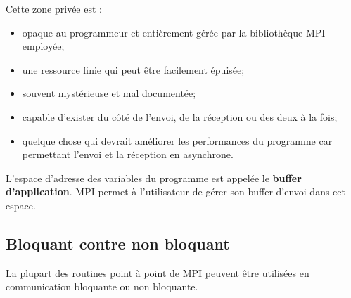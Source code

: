 \documentclass[11pt,a4paper]{article}
\begin{document}
Cette zone privée est :
\begin{itemize}
\item opaque au programmeur et entièrement gérée par la bibliothèque MPI employée;
\item une ressource finie qui peut être facilement épuisée;
\item souvent mystérieuse et mal documentée;
\item capable d'exister du côté de l'envoi, de la réception ou des deux à la fois;
\item quelque chose qui devrait améliorer les performances du programme car permettant l'envoi et
la réception en asynchrone. 
\end{itemize}

L'espace d'adresse des variables du programme est appelée le \textbf{buffer d'application}. MPI permet à l'utilisateur de gérer son
buffer d'envoi dans cet espace.

\subsection{Bloquant contre non bloquant}

La plupart des routines point à point de MPI peuvent être utilisées en communication bloquante ou non bloquante. 
\end{document}
